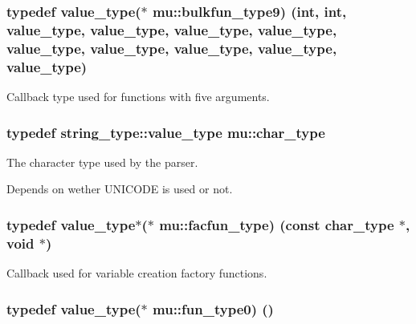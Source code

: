 \subsubsection[{\texorpdfstring{bulkfun\+\_\+type9}{bulkfun_type9}}]{\setlength{\rightskip}{0pt plus 5cm}typedef {\bf value\+\_\+type}($\ast$ mu\+::bulkfun\+\_\+type9) (int, int, {\bf value\+\_\+type}, {\bf value\+\_\+type}, {\bf value\+\_\+type}, {\bf value\+\_\+type}, {\bf value\+\_\+type}, {\bf value\+\_\+type}, {\bf value\+\_\+type}, {\bf value\+\_\+type}, {\bf value\+\_\+type})}\hypertarget{namespacemu_a51c71d5698d29b40688feaa8e968efc9}{}\label{namespacemu_a51c71d5698d29b40688feaa8e968efc9}


Callback type used for functions with five arguments. 

\subsubsection[{\texorpdfstring{char\+\_\+type}{char_type}}]{\setlength{\rightskip}{0pt plus 5cm}typedef string\+\_\+type\+::value\+\_\+type {\bf mu\+::char\+\_\+type}}\hypertarget{namespacemu_a81cc89a81a8872430ab1799b5848c5ca}{}\label{namespacemu_a81cc89a81a8872430ab1799b5848c5ca}


The character type used by the parser. 

Depends on wether U\+N\+I\+C\+O\+DE is used or not. 
\subsubsection[{\texorpdfstring{facfun\+\_\+type}{facfun_type}}]{\setlength{\rightskip}{0pt plus 5cm}typedef {\bf value\+\_\+type}$\ast$($\ast$ mu\+::facfun\+\_\+type) (const {\bf char\+\_\+type} $\ast$, void $\ast$)}\hypertarget{namespacemu_a97af5f5c39391d262dda72084788b83e}{}\label{namespacemu_a97af5f5c39391d262dda72084788b83e}


Callback used for variable creation factory functions. 

\subsubsection[{\texorpdfstring{fun\+\_\+type0}{fun_type0}}]{\setlength{\rightskip}{0pt plus 5cm}typedef {\bf value\+\_\+type}($\ast$ mu\+::fun\+\_\+type0) ()}\hypertarget{namespacemu_af74b1b05cca11b94eb7a478c6c1f8200}{}\label{namespacemu_af74b1b05cca11b94eb7a478c6c1f8200}


